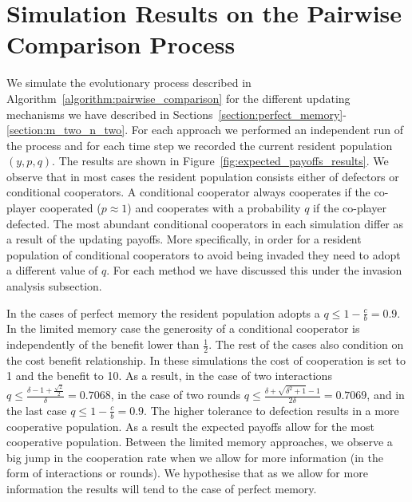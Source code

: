 \documentclass[11pt]{article}
\theoremstyle{plainCl1}
\theoremstyle{plainCl2}
\begin{document}
\section{Simulation Results on the Pairwise Comparison Process}\label{section:simulation_results}

We simulate the evolutionary process described in
Algorithm~\ref{algorithm:pairwise_comparison} for the different updating
mechanisms we have described in
Sections~\ref{section:perfect_memory}-\ref{section:m_two_n_two}. For each
approach we performed an independent run of the process and for each time step we
recorded the current resident population \((y, p, q)\). The results are shown in
Figure~\ref{fig:expected_payoffs_results}. We observe that in most cases the
resident population consists either of defectors or conditional cooperators. A
conditional cooperator always cooperates if the co-player cooperated
($p\approx1$) and cooperates with a probability \(q\) if the co-player defected.
The most abundant conditional cooperators in each simulation differ as a
result of the updating payoffs. More specifically, in order for a resident
population of conditional cooperators to avoid being invaded they need to adopt
a different value of \(q\). For each method we have discussed this under the
invasion analysis subsection. 

In the cases of perfect memory the resident population adopts a \(q \leq 1 -
\frac{c}{b}=0.9\). In the limited memory case the generosity of a conditional
cooperator is independently of the benefit lower than \(\frac{1}{2}\). The rest
of the cases also condition on the cost benefit relationship. In these
simulations the cost of cooperation is set to 1 and the benefit to 10. As a
result, in the case of two interactions \(q \leq \frac{\delta - 1 +
\frac{\sqrt{2}}{2}}{\delta}=0.7068\), in the case of two rounds \(q \leq
\frac{\delta + \sqrt{\delta^{2} + 1} - 1}{2 \delta}=0.7069\), and in the last
case \(q \leq 1 - \frac{c}{b}=0.9\). The higher tolerance to defection results
in a more cooperative population. As a result the expected payoffs allow for the
most cooperative population. Between the limited memory approaches, we observe a
big jump in the cooperation rate when we allow for more information
(in the form of interactions or rounds). We hypothesise that as we
allow for more information the results will tend to the case of perfect memory.
\end{document}
